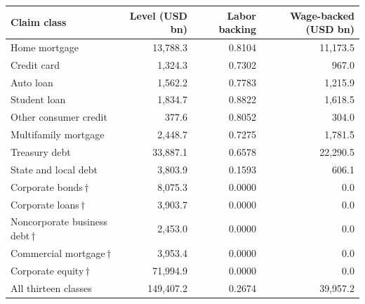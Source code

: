 \begin{tabular}{lrrr}
\toprule
Claim class & Level (USD bn) & Labor backing & Wage-backed (USD bn) \\
\midrule
Home mortgage & 13,788.3 & 0.8104 & 11,173.5 \\
Credit card & 1,324.3 & 0.7302 & 967.0 \\
Auto loan & 1,562.2 & 0.7783 & 1,215.9 \\
Student loan & 1,834.7 & 0.8822 & 1,618.5 \\
Other consumer credit & 377.6 & 0.8052 & 304.0 \\
Multifamily mortgage & 2,448.7 & 0.7275 & 1,781.5 \\
Treasury debt & 33,887.1 & 0.6578 & 22,290.5 \\
State and local debt & 3,803.9 & 0.1593 & 606.1 \\
Corporate bonds\,$\dagger$ & 8,075.3 & 0.0000 & 0.0 \\
Corporate loans\,$\dagger$ & 3,903.7 & 0.0000 & 0.0 \\
Noncorporate business debt\,$\dagger$ & 2,453.0 & 0.0000 & 0.0 \\
Commercial mortgage\,$\dagger$ & 3,953.4 & 0.0000 & 0.0 \\
Corporate equity\,$\dagger$ & 71,994.9 & 0.0000 & 0.0 \\
\midrule
All thirteen classes & 149,407.2 & 0.2674 & 39,957.2 \\
\bottomrule
\end{tabular}
